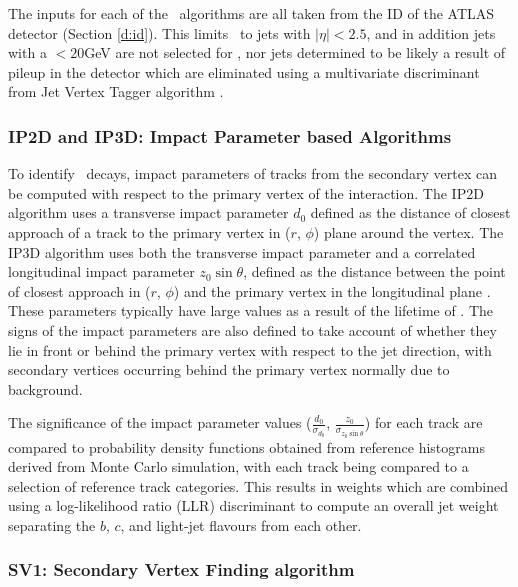 	The inputs for each of the \btagging\, algorithms are all taken from the ID of the ATLAS detector (Section \ref{d:id}). This limits \btagging\, to jets with $|\eta|<2.5$, and in addition jets with a \pt$<20$GeV are not selected for \btagging, nor jets determined to be likely a result of pileup in the detector which are eliminated using a multivariate discriminant from Jet Vertex Tagger algorithm \cite{btagOptimisation, pileup}.

	\subsubsection{IP2D and IP3D: Impact Parameter based Algorithms}
		\label{det:btag:ip}

		To identify \bhadron\ decays, impact parameters of tracks from the secondary vertex can be computed with respect to the primary vertex of the interaction. The IP2D algorithm uses a transverse impact parameter $d_0$ defined as the distance of closest approach of a track to the  primary vertex in ($r$, $\phi$) plane around the vertex. The IP3D algorithm uses both the transverse impact parameter and a correlated longitudinal impact parameter $z_0\sin\theta$, defined as the distance between the point of closest approach in ($r$, $\phi$) and the primary vertex in the longitudinal plane \cite{IP3D}. These parameters typically have large values as a result of the lifetime of \bquark. The signs of the impact parameters are also defined to take account of whether they lie in front or behind the primary vertex with respect to the jet direction, with secondary vertices occurring behind the primary vertex normally due to background.

		The significance of the impact parameter values ($\frac{d_0}{\sigma_{d_0}}$, $\frac{z_0}{\sigma_{z_0\sin\theta}}$) for each track are compared to probability density functions obtained from reference histograms derived from Monte Carlo simulation, with each track being compared to a selection of reference track categories. This results in weights which are combined using a log-likelihood ratio (LLR) discriminant to compute an overall jet weight separating the $b$, $c$, and light-jet flavours from each other. \cite{btagOptimisation, bTagPerformance}

	\subsubsection{SV1: Secondary Vertex Finding algorithm}
	\label{det:btag:sv}

